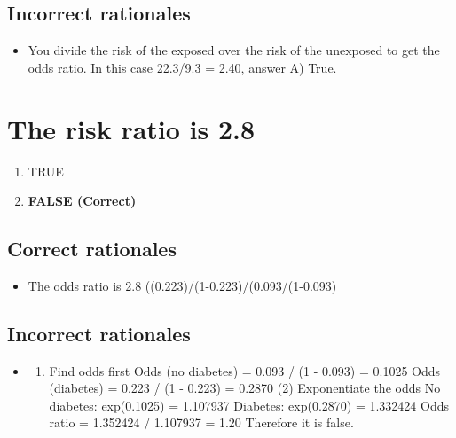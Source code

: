 \documentclass[letterpaper,9pt,twoside,]{pinp}
\providecommand{\tightlist}{%
  \setlength{\itemsep}{0pt}\setlength{\parskip}{0pt}}
\begin{document}
\hypertarget{incorrect-rationales-1}{%
\subsection{Incorrect rationales}\label{incorrect-rationales-1}}

\begin{itemize}
\tightlist
\item
  You divide the risk of the exposed over the risk of the unexposed to
  get the odds ratio. In this case 22.3/9.3 = 2.40, answer A) True.
\end{itemize}

\hypertarget{the-risk-ratio-is-2.8}{%
\section{The risk ratio is 2.8}\label{the-risk-ratio-is-2.8}}

\begin{enumerate}
\def\labelenumi{\alph{enumi}.}
\tightlist
\item
  TRUE
\item
  \textbf{FALSE (Correct)}
\end{enumerate}

\hypertarget{correct-rationales-2}{%
\subsection{Correct rationales}\label{correct-rationales-2}}

\begin{itemize}
\tightlist
\item
  The odds ratio is 2.8 ((0.223)/(1-0.223)/(0.093/(1-0.093)
\end{itemize}

\hypertarget{incorrect-rationales-2}{%
\subsection{Incorrect rationales}\label{incorrect-rationales-2}}

\begin{itemize}
\item
  \begin{enumerate}
  \def\labelenumi{(\arabic{enumi})}
  \tightlist
  \item
    Find odds first Odds (no diabetes) = 0.093 / (1 - 0.093) = 0.1025
    Odds (diabetes) = 0.223 / (1 - 0.223) = 0.2870 (2) Exponentiate the
    odds No diabetes: exp(0.1025) = 1.107937 Diabetes: exp(0.2870) =
    1.332424 Odds ratio = 1.352424 / 1.107937 = 1.20 Therefore it is
    false.
  \end{enumerate}
\end{itemize}
\end{document}

